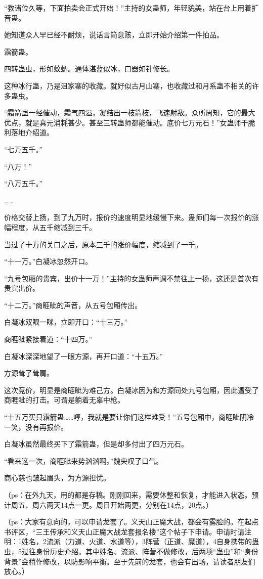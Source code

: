\begin{this_body}
“教诸位久等，下面拍卖会正式开始！”主持的女蛊师，年轻貌美，站在台上用着扩音蛊。

她知道众人早已经不耐烦，说话言简意赅，立即开始介绍第一件拍品。

霜箭蛊。

四转蛊虫，形如蚊蚋。通体湛蓝似冰，口器如针修长。

这种冰行蛊，乃是沮家寨的收藏。就好似古月山寨，也收藏过和月系蛊不相关的许多蛊虫。

“霜箭蛊一经催动，霜气四溢，凝结出一枝箭枝，飞速射敌。众所周知，它的最大优点，就是真元消耗甚少。甚至三转蛊师都能催动。底价七万元石！”女蛊师干脆利落地介绍道。

“七万五千。”

“八万！”

“八万五千。”

……

价格交替上扬，到了九万时，报价的速度明显地缓慢下来。蛊师们每一次报价的涨幅程度，从五千缩减到三千。

当过了十万的关口之后，原本三千的涨价幅度，缩减到了一千。

“十一万。”白凝冰忽然开口。

“九号包厢的贵宾，出价十一万！”主持的女蛊师声调不禁往上一扬，这还是首次有贵宾出价。

“十二万。”商睚眦的声音，从五号包厢传出。

白凝冰双眼一眯，立即开口：“十三万。”

商睚眦紧接着道：“十四万。”

白凝冰深深地望了一眼方源，再开口道：“十五万。”

方源耸了耸肩。

这次竞价，明显是商睚眦为难己方。白凝冰因为和方源同处九号包厢，因此遭受了商睚眦的打击。可谓是躺着无辜中枪。

“十五万买只霜箭蛊……哼，我就是要让你们这样难受！”五号包厢中，商睚眦阴冷一笑，没有再报价。

白凝冰虽然最终买下了霜箭蛊，但是却多付出了四万元石。

“看来这一次，商睚眦来势汹汹啊。”魏央叹了口气。

商心慈也皱起眉头，为方源担忧。

（ps：在外九天，用的都是存稿。刚刚回来，需要休整和恢复，才能进入状态。预计周五、周六两天14点一更。周日开始两更，分别在14点，20点。）

（ps：大家有意向的，可以申请龙套了。义天山正魔大战，都会有露脸的。在起点书评区，“三王传承和义天山正魔大战龙套报名楼”这个帖子下申请。申请时请注明：1姓名，2流派（力道、火道、水道等），3阵营（正道、魔道），4自身携带的蛊虫，5过往身份历史介绍。其中姓名、流派、阵营不做修改，后两项“蛊虫”和“身份背景”会稍作修改，以防影响平衡。至于先前的龙套，也会有出场，请读者朋友们放心。）

\end{this_body}


